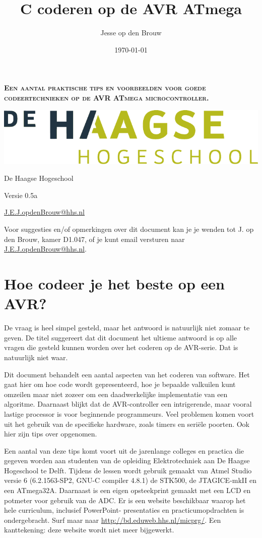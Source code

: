 \documentclass[12pt,a4paper,final,twoside,fleqn]{article}
\author{Jesse op den Brouw}
\title{C coderen op de AVR ATmega}
\date{\today}
\makeatletter
\newcommand{\subtitle}{Een aantal praktische tips en voorbeelden voor goede codeertechnieken op de AVR ATmega microcontroller.}
\newcommand{\version}{0.5a}
\newcommand\emailaddress{\href{mailto:J.E.J.opdenBrouw@hhs.nl}{\sffamily J.E.J.opdenBrouw@hhs.nl}}
\def\maketitle{%
  \null
  \thispagestyle{empty}%
  \vfill
  \begin{center}\leavevmode
    {\fontfamily{phv}\fontsize{30pt}{36pt}\selectfont\bfseries\scshape \@title\par}%
    \vskip 1.0cm
    {\fontfamily{phv}\fontsize{13pt}{16pt}\selectfont\bfseries\scshape \subtitle\par}%
    \vskip 8.0cm
    \begin{minipage}[c]{.50\linewidth}
       \includegraphics[width=\linewidth]{HHS_grijs_groen_fc}
    \end{minipage}\hfill
    \begin{minipage}[c]{0.40\linewidth}
       {\hfill \large \@author\par}%
       \vskip 0.03cm
       {\hfill \large De Haagse Hogeschool\par}%
       \vskip 0.03cm
       {\hfill \large \@date\par}%
       \vskip 0.03cm
       {\hfill \large Versie \version\par}%
       \vskip 0.03cm
       {\hfill \large \emailaddress\par}%
  \end{minipage}
  \end{center}%
  \vfill
  \null
  }
\makeatother
\begin{document}
\maketitle

\newpage
\tableofcontents
\vfill
Voor suggesties en/of opmerkingen over dit document kan je je wenden tot
J. op den Brouw, kamer D1.047, of je kunt email versturen naar \emailaddress.


\newpage
\listoffigures
\lstlistoflistings

\setcounter{section}{-1}
\newpage
\thispagestyle{fancy}
\section{Hoe codeer je het beste op een AVR?}
De vraag is heel simpel gesteld, maar het antwoord is natuurlijk niet
zomaar te geven.
De titel suggereert dat dit document het ultieme antwoord is op
alle vragen die gesteld kunnen worden over het coderen op de AVR-serie.
Dat is natuurlijk niet waar. 

Dit document behandelt een aantal aspecten van het coderen van software.
Het gaat hier om hoe code wordt gepresenteerd, hoe je bepaalde valkuilen
kunt omzeilen maar niet zozeer om een daadwerkelijke implementatie van een
algoritme. Daarnaast blijkt dat de AVR-controller een intrigerende, maar
vooral lastige processor is voor beginnende programmeurs. Veel problemen
komen voort uit het gebruik van de specifieke hardware, zoals timers en
seri\"{e}le poorten. Ook hier zijn tips over opgenomen.

Een aantal van deze tips komt voort uit de jarenlange colleges en practica
die gegeven worden aan studenten van de opleiding Elektrotechniek aan De
Haagse Hogeschool te Delft. Tijdens de lessen wordt gebruik gemaakt van
Atmel Studio versie 6 (6.2.1563-SP2, GNU-C compiler 4.8.1)
de STK500, de JTAGICE-mkII en een ATmega32A. Daarnaast is een eigen
opsteekprint gemaakt met een LCD en potmeter voor gebruik van de ADC.
Er is een website beschikbaar waarop het hele curriculum, inclusief PowerPoint-%
presentaties en practicumopdrachten is ondergebracht. Surf maar naar
\url{http://bd.eduweb.hhs.nl/micprg/}. Een kanttekening: deze website wordt
niet meer bijgewerkt.
\end{document}
